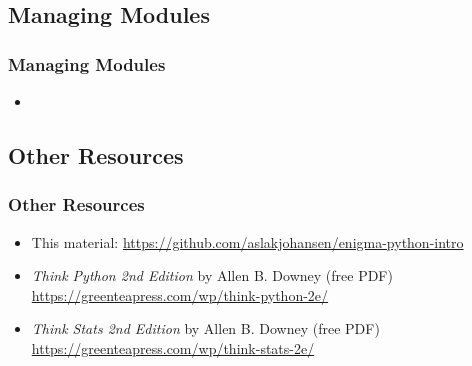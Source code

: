 \subsection{Managing Modules}
\begin{frame}
    \frametitle{Managing Modules}
    \vspace{5mm}
    
    \begin{itemize}
      \item 
    \end{itemize}
\end{frame}

\subsection{Other Resources}
\begin{frame}
    \frametitle{Other Resources}
    \vspace{5mm}
    
    \begin{itemize}
      \item This material: \url{https://github.com/aslakjohansen/enigma-python-intro}
      \item \textsl{Think Python 2nd Edition} by Allen B. Downey (free PDF)\\
            \url{https://greenteapress.com/wp/think-python-2e/}
      \item \textsl{Think Stats 2nd Edition} by Allen B. Downey (free PDF)\\
            \url{https://greenteapress.com/wp/think-stats-2e/}
    \end{itemize}
\end{frame}


